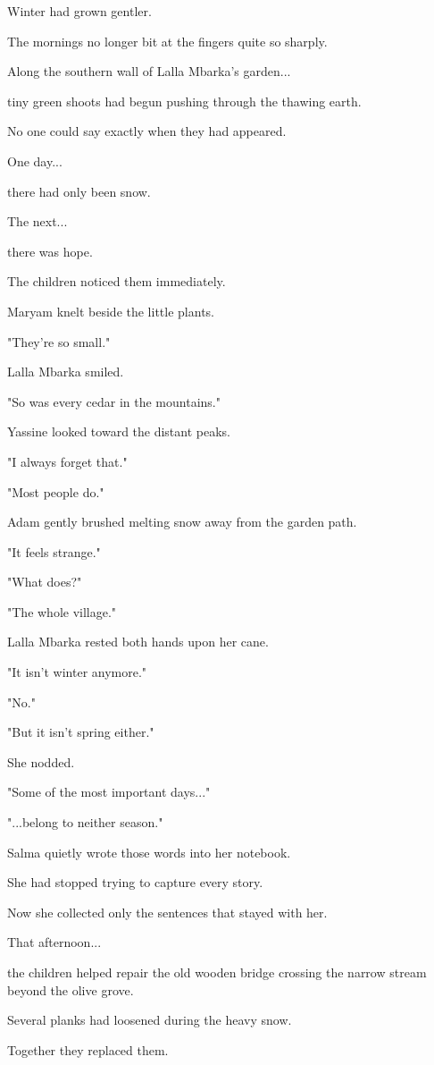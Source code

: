 \documentclass[12pt,openany]{book}
\begin{document}
Winter had grown gentler.

The mornings no longer bit at the fingers quite so sharply.

Along the southern wall of Lalla Mbarka's garden...

tiny green shoots had begun pushing through the thawing earth.

No one could say exactly when they had appeared.

One day...

there had only been snow.

The next...

there was hope.

The children noticed them immediately.

Maryam knelt beside the little plants.

"They're so small."

Lalla Mbarka smiled.

"So was every cedar in the mountains."

Yassine looked toward the distant peaks.

"I always forget that."

"Most people do."

Adam gently brushed melting snow away from the garden path.

"It feels strange."

"What does?"

"The whole village."

Lalla Mbarka rested both hands upon her cane.

"It isn't winter anymore."

"No."

"But it isn't spring either."

She nodded.

"Some of the most important days..."

"...belong to neither season."

Salma quietly wrote those words into her notebook.

She had stopped trying to capture every story.

Now she collected only the sentences that stayed with her.

That afternoon...

the children helped repair the old wooden bridge crossing the narrow stream beyond the olive grove.

Several planks had loosened during the heavy snow.

Together they replaced them.
\end{document}
